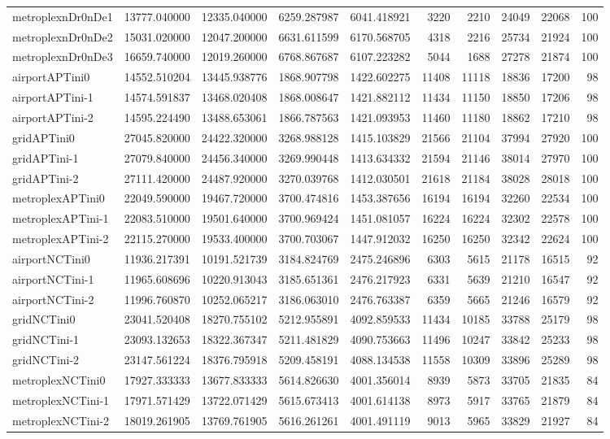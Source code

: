 \begin{longtable}{|l|r|r|r|r|r|r|r|r|r}
metroplexnDr0nDe1 & 13777.040000 & 12335.040000 & 6259.287987 & 6041.418921 & 3220 & 2210 & 24049 & 22068 & 100 \\
metroplexnDr0nDe2 & 15031.020000 & 12047.200000 & 6631.611599 & 6170.568705 & 4318 & 2216 & 25734 & 21924 & 100 \\
metroplexnDr0nDe3 & 16659.740000 & 12019.260000 & 6768.867687 & 6107.223282 & 5044 & 1688 & 27278 & 21874 & 100 \\
airportAPTini0 & 14552.510204 & 13445.938776 & 1868.907798 & 1422.602275 & 11408 & 11118 & 18836 & 17200 & 98 \\
airportAPTini-1 & 14574.591837 & 13468.020408 & 1868.008647 & 1421.882112 & 11434 & 11150 & 18850 & 17206 & 98 \\
airportAPTini-2 & 14595.224490 & 13488.653061 & 1866.787563 & 1421.093953 & 11460 & 11180 & 18862 & 17210 & 98 \\
gridAPTini0 & 27045.820000 & 24422.320000 & 3268.988128 & 1415.103829 & 21566 & 21104 & 37994 & 27920 & 100 \\
gridAPTini-1 & 27079.840000 & 24456.340000 & 3269.990448 & 1413.634332 & 21594 & 21146 & 38014 & 27970 & 100 \\
gridAPTini-2 & 27111.420000 & 24487.920000 & 3270.039768 & 1412.030501 & 21618 & 21184 & 38028 & 28018 & 100 \\
metroplexAPTini0 & 22049.590000 & 19467.720000 & 3700.474816 & 1453.387656 & 16194 & 16194 & 32260 & 22534 & 100 \\
metroplexAPTini-1 & 22083.510000 & 19501.640000 & 3700.969424 & 1451.081057 & 16224 & 16224 & 32302 & 22578 & 100 \\
metroplexAPTini-2 & 22115.270000 & 19533.400000 & 3700.703067 & 1447.912032 & 16250 & 16250 & 32342 & 22624 & 100 \\
airportNCTini0 & 11936.217391 & 10191.521739 & 3184.824769 & 2475.246896 & 6303 & 5615 & 21178 & 16515 & 92 \\
airportNCTini-1 & 11965.608696 & 10220.913043 & 3185.651361 & 2476.217923 & 6331 & 5639 & 21210 & 16547 & 92 \\
airportNCTini-2 & 11996.760870 & 10252.065217 & 3186.063010 & 2476.763387 & 6359 & 5665 & 21246 & 16579 & 92 \\
gridNCTini0 & 23041.520408 & 18270.755102 & 5212.955891 & 4092.859533 & 11434 & 10185 & 33788 & 25179 & 98 \\
gridNCTini-1 & 23093.132653 & 18322.367347 & 5211.481829 & 4090.753663 & 11496 & 10247 & 33842 & 25233 & 98 \\
gridNCTini-2 & 23147.561224 & 18376.795918 & 5209.458191 & 4088.134538 & 11558 & 10309 & 33896 & 25289 & 98 \\
metroplexNCTini0 & 17927.333333 & 13677.833333 & 5614.826630 & 4001.356014 & 8939 & 5873 & 33705 & 21835 & 84 \\
metroplexNCTini-1 & 17971.571429 & 13722.071429 & 5615.673413 & 4001.614138 & 8973 & 5917 & 33765 & 21879 & 84 \\
metroplexNCTini-2 & 18019.261905 & 13769.761905 & 5616.261261 & 4001.491119 & 9013 & 5965 & 33829 & 21927 & 84 \\
\end{longtable}
